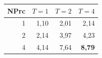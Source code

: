 \begin{tabular}{@{}rrrr@{}}
\toprule
NPrc & $T=1$ & $T=2$ & $T=4$ \\
\midrule
1 & 1{,}10 & 2{,}01 & 2{,}14 \\
2 & 2{,}14 & 3{,}97 & 4{,}23 \\
4 & 4{,}14 & 7{,}64 & \textbf{8{,}79} \\
\bottomrule
\end{tabular}
